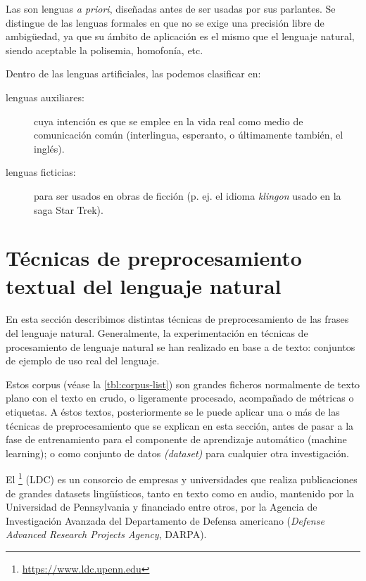 Las  son lenguas \emph{a priori}, diseñadas antes de ser usadas por sus parlantes. Se distingue de las lenguas formales en que no se exige una precisión libre de ambigüedad, ya que su ámbito de aplicación es el mismo que el lenguaje natural, siendo aceptable la polisemia, homofonía, etc.

Dentro de las lenguas artificiales, las podemos clasificar en:
\nopagebreak
\begin{description}
\item[lenguas auxiliares:] cuya intención es que se emplee en la vida real como medio de comunicación común (interlingua, esperanto, o últimamente también, el inglés).
\item[lenguas ficticias:] para ser usados en obras de ficción (p. ej. el idioma \emph{klingon} usado en la saga Star Trek).
\end{description}


\section{Técnicas de preprocesamiento textual del lenguaje natural}
\label{sec:preproc-NLP}

En esta sección describimos distintas técnicas de preprocesamiento de las frases del lenguaje natural. Generalmente, la experimentación en técnicas de procesamiento de lenguaje natural se han realizado en base a  de texto: conjuntos de ejemplo de uso real del lenguaje.

Estos corpus (véase la \autoref{tbl:corpus-list}) son grandes ficheros normalmente de texto plano con el texto en crudo, o ligeramente procesado, acompañado de métricas o etiquetas. A éstos textos, posteriormente se le puede aplicar una o más de las técnicas de preprocesamiento que se explican en esta sección, antes de pasar a la fase de entrenamiento para el componente de aprendizaje automático (machine learning); o como conjunto de datos \emph{(dataset)} para cualquier otra investigación.

El \footnote{\url{https://www.ldc.upenn.edu}} (LDC) es un consorcio de empresas y universidades que realiza publicaciones de grandes datasets lingüísticos, tanto en texto como en audio, mantenido por la Universidad de Pennsylvania y financiado entre otros, por la Agencia de Investigación Avanzada del Departamento de Defensa americano (\emph{Defense Advanced Research Projects Agency}, DARPA).

